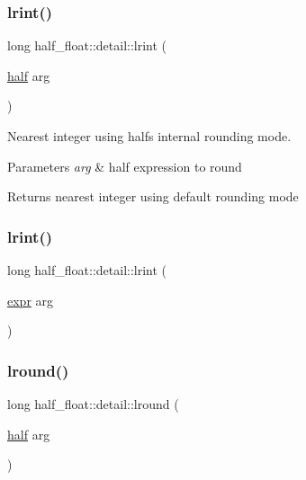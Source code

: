 \subsubsection{\texorpdfstring{lrint()}{lrint()}\hspace{0.1cm}{\footnotesize\ttfamily [1/2]}}
{\footnotesize\ttfamily long half\+\_\+float\+::detail\+::lrint (\begin{DoxyParamCaption}\item[{\hyperlink{classhalf__float_1_1half}{half}}]{arg }\end{DoxyParamCaption})\hspace{0.3cm}{\ttfamily [inline]}}

Nearest integer using half\textquotesingle{}s internal rounding mode. 
\begin{DoxyParams}{Parameters}
{\em arg} & half expression to round \\
\hline
\end{DoxyParams}
\begin{DoxyReturn}{Returns}
nearest integer using default rounding mode 
\end{DoxyReturn}
\mbox{\label{namespacehalf__float_1_1detail_a25108b6b800a6693f27963e6183f8c19}} 
\subsubsection{\texorpdfstring{lrint()}{lrint()}\hspace{0.1cm}{\footnotesize\ttfamily [2/2]}}
{\footnotesize\ttfamily long half\+\_\+float\+::detail\+::lrint (\begin{DoxyParamCaption}\item[{\hyperlink{structhalf__float_1_1detail_1_1expr}{expr}}]{arg }\end{DoxyParamCaption})\hspace{0.3cm}{\ttfamily [inline]}}

\mbox{\label{namespacehalf__float_1_1detail_abff729297b6ad9e7ad431f73d280b76d}} 
\subsubsection{\texorpdfstring{lround()}{lround()}\hspace{0.1cm}{\footnotesize\ttfamily [1/2]}}
{\footnotesize\ttfamily long half\+\_\+float\+::detail\+::lround (\begin{DoxyParamCaption}\item[{\hyperlink{classhalf__float_1_1half}{half}}]{arg }\end{DoxyParamCaption})\hspace{0.3cm}{\ttfamily [inline]}}

